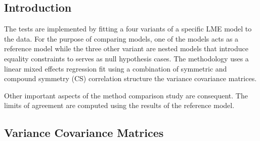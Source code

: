 \documentclass[12pt, a4paper]{report}
\theoremstyle{plain}
\theoremstyle{definition}
\theoremstyle{remark}
\begin{document}


%
%
	
	\subsection{Introduction}
	The tests are implemented by fitting a four variants of a specific LME model to the data. For the purpose of comparing models, one of the models acts as a reference model while the three other variant are nested models that introduce equality constraints to serves as null hypothesis cases. The methodology uses a linear mixed effects regression fit using a combination of symmetric and 
	compound symmetry (CS) correlation structure the variance covariance matrices.
	
	Other important aspects of the method comparison study are consequent. The limits of agreement are computed using the results of the reference model.
	
	
	
	
	
	
	
	\subsection{Variance Covariance Matrices }
	
\end{document}
